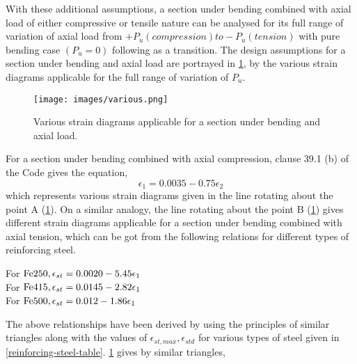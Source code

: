 With these additional assumptions, a section under bending combined with
axial load of either compressive or tensile nature can be analysed for
its full range of variation of axial load from
$+P_u (compression) to -P_u (tension)$ with pure bending case $(P_u=0)$
following as a transition. The design assumptions for a section under
bending and axial load are portrayed in \fig
\ref{fig:SectionUnderBendingandAxialLoad}, by the various strain
diagrams applicable for the full range of variation of $P_u$.
\begin{figure}
\centering
\texttt{[image: images/various.png]}
\caption{Various strain diagrams applicable for a section under bending and axial load.}
\label{fig:SectionUnderBendingandAxialLoad}
\end{figure}
For a section under bending combined with axial compression, clause
39.1 (b) of the Code gives the equation,
\begin{equation}
\epsilon_1=0.0035-0.75\epsilon_2
\label{BendingwithAxial}
\end{equation}
which represents various strain diagrams given in the line rotating about
the point A (\fig \ref{fig:SectionUnderBendingandAxialLoad}).
On a similar analogy, the line rotating about the
point B (\fig \ref{fig:SectionUnderBendingandAxialLoad}) gives different
strain diagrams applicable for a section under bending combined with
axial tension, which can be got from the following relations for
different types of reinforcing steel.

\begin{center}
For $\fetwofivezero,\epsilon_{st}=0.0020-5.45\epsilon_1$\\
For $\fefouronefive,\epsilon_{st}=0.0145-2.82\epsilon_1$\\
For $\fefivezerozero,\epsilon_{st}=0.012-1.86\epsilon_1$
\end{center}

The above relationships have been derived by using the principles of
similar triangles along with the values of $\epsilon_{st,max}, \epsilon_{std}$ for
various types of steel given in \tablem \ref{reinforcing-steel-table}. \fig
\ref{fig:SectionUnderBendingandAxialLoad} gives by similar triangles,

